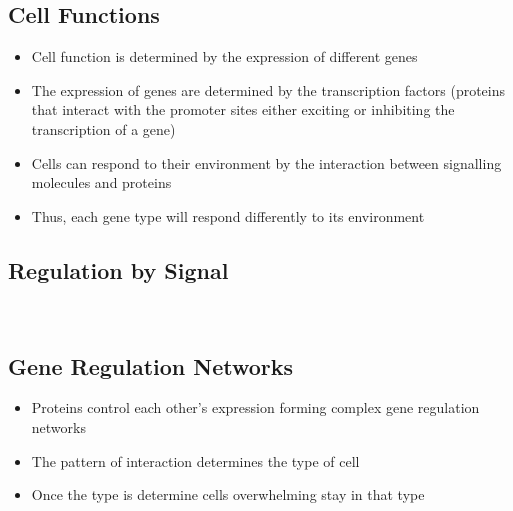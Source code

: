 
\begin{slide}
\section{Cell Functions}

\begin{PauseHighLight}
  \begin{itemize}
  \item Cell function is determined by the expression of different
    genes\pause
  \item The expression of genes are determined by the transcription
    factors (proteins that interact with the promoter sites either
    exciting or inhibiting the transcription of a gene)\pause
  \item Cells can respond to their environment by the interaction
    between signalling molecules and proteins\pause
  \item Thus, each gene type will respond differently to its environment\pause
  \end{itemize}
\end{PauseHighLight}

\end{slide}


\begin{slide}
\section[-2]{Regulation by Signal}

\pause
\pb
{}
\begin{center}
  \pause\\
  \pause
\end{center}
\end{slide}


\begin{slide}
\section{Gene Regulation Networks}

\begin{PauseHighLight}
  \begin{itemize}
  \item Proteins control each other's expression forming complex gene
    regulation networks\pause
  \item The pattern of interaction determines the type of cell\pause
  \item Once the type is determine cells overwhelming stay in that
    type\pause
  \end{itemize}
\end{PauseHighLight}

\end{slide}

